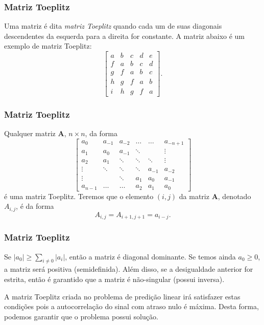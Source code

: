 \begin{frame}
  \frametitle{Matriz Toeplitz}
  Uma matriz é dita \emph{matriz Toeplitz} quando cada um de suas diagonais descendentes da esquerda para a direita for constante.
  A matriz abaixo é um exemplo de matriz Toeplitz:
  \begin{equation}
  \begin{bmatrix}
a & b & c & d & e \\
f & a & b & c & d \\
g & f & a & b & c \\
h & g & f & a & b \\
i & h & g & f & a 
\end{bmatrix}.
  \end{equation}
\end{frame}

\begin{frame}
  \frametitle{Matriz Toeplitz}
  Qualquer matriz $\mathbf{A}$, $ n\times n$, da forma
  \begin{equation}
  \begin{bmatrix}
    a_{0} & a_{-1} & a_{-2} & \ldots & \ldots  &a_{-n+1}  \\
    a_{1} & a_0  & a_{-1} &  \ddots   &  &  \vdots \\
    a_{2}    & a_{1} & \ddots  & \ddots & \ddots& \vdots \\ 
   \vdots &  \ddots & \ddots &   \ddots  & a_{-1} & a_{-2}\\
   \vdots &         & \ddots & a_{1} & a_{0}&  a_{-1} \\
  a_{n-1} &  \ldots & \ldots & a_{2} & a_{1} & a_{0}
  \end{bmatrix}
  \end{equation}
  é uma matriz Toeplitz. Teremos que o elemento $(i,j)$ da matriz $\mathbf{A}$, denotado $A_{i,j}$, é da forma
  \begin{equation}
  A_{i,j} =  A_{i+1,j+1} = a_{i-j}.
  \end{equation}
\end{frame}

\begin{frame}
  \frametitle{Matriz Toeplitz}
  Se $\vert a_0 \vert \geq \sum_{i\neq 0} \vert a_i \vert$, então a matriz é diagonal dominante.
  Se temos ainda $a_0 \geq 0$, a matriz será positiva (semidefinida).
  Além disso, se a desigualdade anterior for estrita, então é garantido que a matriz é não-singular (possui inversa).

  \vspace{1cm}
  A matriz Toeplitz criada no problema de predição linear irá satisfazer estas condições pois a autocorrelação do sinal com atraso nulo é máxima.
  Desta forma, podemos garantir que o problema possui solução.
\end{frame}

